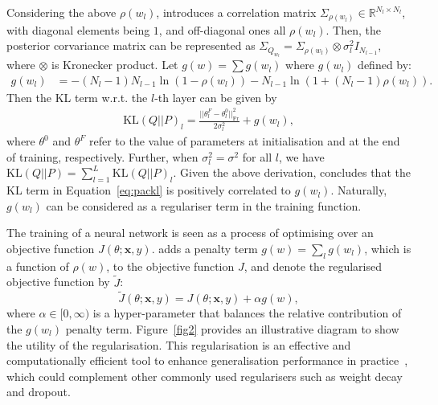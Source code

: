 Considering the above $\rho(w_l)$, \cite{jin2020does} introduces a correlation matrix $\Sigma_{\rho(w_l)} \in \mathbb{R}^{N_l \times N_l}$, with diagonal elements being $1$, and off-diagonal ones all $\rho(w_l)$. Then, the posterior corvariance matrix can be represented as $\Sigma_{Q_{w_l}}=\Sigma_{\rho(w_l)} \otimes \sigma_l^2I_{N_{l-1}}$, where $\otimes$ is Kronecker product. Let $g(w)=\sum g(w_l)$ where $g(w_l)$ defined by:
\begin{align}
     g(w_l)
     &= - (N_l-1)N_{l-1} \ln (1-\rho(w_l)) - N_{l-1} \ln(1+(N_l-1)\rho(w_l)).
\end{align}
Then the KL term w.r.t. the $l$-th layer can be given by
\begin{equation}
\label{eq:packl}
\begin{aligned}
\mathrm{KL}(Q || P)_l=\frac{||\theta_l^F-\theta_l^0||_{\mathrm{Fr}}^2}{2\sigma_l^2} + g(w_l),
\end{aligned}
\end{equation}
where $\theta^0$ and $\theta^F$ refer to the value of parameters at initialisation and at the end of training, respectively. Further, when $\sigma_l^2=\sigma^2$ for all $l$, we have $\mathrm{KL}(Q || P) = \sum_{l=1}^L \mathrm{KL}(Q || P)_l$. Given the above derivation, \cite{jin2020does} concludes that the KL term in Equation~\ref{eq:packl} is positively correlated to $g(w_l)$. Naturally, $g(w_l)$ can be considered as a regulariser term in the training function.

The training of a neural network is seen as a process of optimising over an objective function $J(\theta;\textbf{x},y)$. \cite{jin2020does} adds a penalty term $g(w)=\sum_{l} g(w_{l})$, which is a function of $\rho(w)$, to the objective function $J$, and denote the regularised objective function by $\tilde{J}$:
\begin{equation}
    \tilde{J}(\theta;\textbf{x},y) = J(\theta;\textbf{x},y) + \alpha g(w),
\end{equation}
where $\alpha \in [0,\infty)$ is a hyper-parameter that balances the relative contribution of the $g(w_l)$ penalty term. Figure~\ref{fig2} provides an illustrative diagram to show the utility of the regularisation. This regularisation is an effective and computationally efficient tool to enhance generalisation performance in practice~\cite{jin2020does}, which could complement other commonly used regularisers such as weight decay and dropout.  

